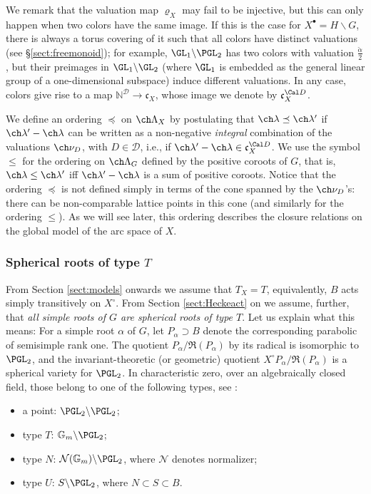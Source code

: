 We remark that the valuation map $\varrho_X$ may fail to be injective, but this can only happen when two colors have the same image. If this is the case for $X^\bullet = H\backslash G$, there is always a torus covering of it such that all colors have distinct valuations (see \S\ref{sect:freemonoid}); for example, $\GL_1\backslash \PGL_2$ has two colors with valuation $\frac{\check\alpha}{2}$, but their preimages in $\GL_1\backslash\GL_2$ (where $\GL_1$ is embedded as the general linear group of a one-dimensional subspace) induce different valuations.
In any case, colors give rise to a map $\mathbb N^{\mathcal D}\to \mathfrak c_X$, whose image we denote by $\mathfrak c_X^{\Cal D}$.

We define an ordering $\preceq$ on $\ch\Lambda_X$ by postulating that $\ch\lambda \preceq \ch\lambda'$ if
$\ch\lambda'-\ch\lambda$ can be written as a non-negative \emph{integral} combination of the valuations $\ch\nu_D$, with $D\in \mathcal D$, i.e., if $\ch\lambda'-\ch\lambda \in \mathfrak c_X^{\Cal D}$. We use the symbol $\le $ for the ordering on $\ch\Lambda_G$ defined by the positive coroots of $G$, that is, $\ch\lambda \le \ch\lambda'$ iff $\ch\lambda'-\ch\lambda$ is a sum of positive coroots. Notice that the ordering $\preceq$ is not defined simply in terms of the cone spanned by the $\ch\nu_D$'s: there can be non-comparable lattice points in this cone (and similarly for the ordering $\le$).
As we will see later, this ordering describes the closure relations on the global model
of the arc space of $X$.

\subsubsection{Spherical roots of type $T$}
\label{subsection:typeT}

From Section \ref{sect:models} onwards we assume that $T_X=T$, equivalently, $B$ acts simply transitively on $X^\circ$. From Section \ref{sect:Heckeact} on we assume, further, that \emph{all simple roots of $G$ are spherical roots of type $T$}. Let us explain what this means:
For a simple root $\alpha$ of $G$, let $P_\alpha \supset B$ denote
the corresponding parabolic of semisimple rank one. The quotient $P_\alpha/\mathfrak R(P_\alpha)$ by its radical is isomorphic to $\PGL_2$, and the invariant-theoretic (or geometric) quotient $X^\circ P_\alpha/\mathfrak R(P_\alpha)$ is a spherical variety for $\PGL_2$. In characteristic zero, over an algebraically closed field, those belong to one of the following types, see \cite[Lemma 3.2]{KnBorbit}:
\begin{itemize}
 \item a point: $\PGL_2\backslash\PGL_2$;
 \item type $T$: $\mathbb G_m\backslash \PGL_2$;
 \item type $N$: $\mathcal N(\mathbb G_m)\backslash\PGL_2$, where $\mathcal N$ denotes normalizer;
 \item type $U$: $S\backslash \PGL_2$, where $N\subset S\subset B$.
\end{itemize}

